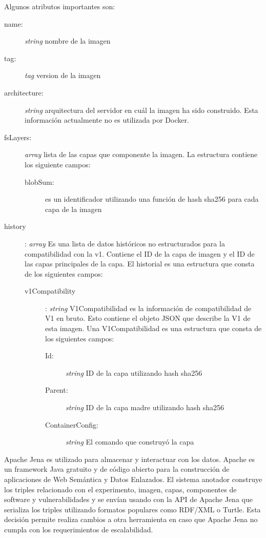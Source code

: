 Algunos atributos importantes son:

\begin{description}
	\item [name:] \textit{string} nombre de la imagen
	\item [tag:] \textit{tag} version de la imagen
	\item [architecture:] \textit{string} arquitectura del servidor en cuál la imagen ha sido construido. Esta información actualmente no es utilizada por Docker.
	\item [fsLayers:] \textit{array} lista de las capas que componente la imagen.
		La estructura contiene los siguiente campos:
		\begin{description}
			\item [blobSum:] es un identificador utilizando una función de hash sha256 para cada capa de la imagen 
		\end{description}
	\item [history]: \textit{array} Es una lista de datos históricos no estructurados para la compatibilidad con la v1. Contiene el ID de la capa de imagen y el ID de las capas principales de la capa. El historial es una estructura que consta de los siguientes campos:
	\begin{description}
		\item[v1Compatibility]:  \textit{string} V1Compatibilidad es la información de compatibilidad de V1 en bruto. Esto contiene el objeto JSON que describe la V1 de esta imagen. Una V1Compatibilidad es una estructura que consta de los siguientes campos:
		
		\begin{description}
			\item [Id:] \textit{string} ID de la capa utilizando hash sha256			\item [Parent:] \textit{string} ID de la capa madre utilizando hash sha256
				\item [ContainerConfig:] \textit{string} El comando que construyó la capa
		\end{description}
	\end{description}
\end{description}

Apache Jena es utilizado para almacenar y interactuar con los datos. Apache es un framework Java gratuito y de código abierto para la construcción de aplicaciones de Web Semántica y Datos Enlazados. 
El sistema anotador construye los triples relacionado con el experimento, imagen, capas, componentes de software y vulnerabilidades y se envían usando con la API de Apache Jena que serializa los triples utilizando formatos populares como RDF/XML o Turtle.
Esta decisión permite realiza cambios a otra herramienta en caso que Apache Jena no cumpla con los requerimientos de escalabilidad.





